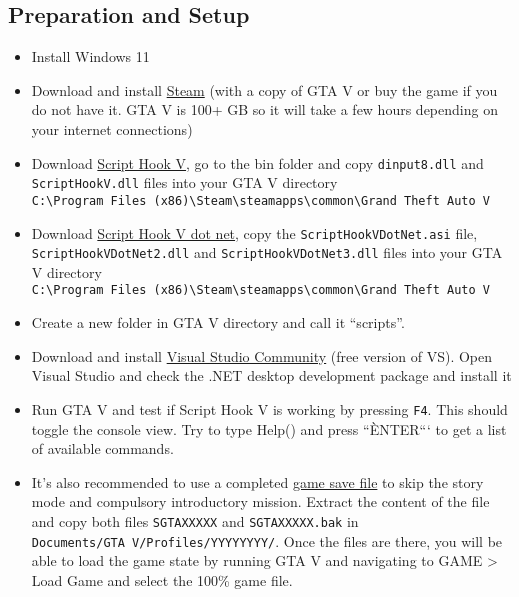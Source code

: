 \documentclass[
  openany]{book}
\begin{document}
\hypertarget{preparation-and-setup}{%
\subsection*{Preparation and Setup}\label{preparation-and-setup}}

\begin{itemize}
\item
  Install Windows 11
\item
  Download and install \href{https://store.steampowered.com/about/}{Steam} (with a copy of GTA V or buy the game if you do not have it. GTA V is 100+ GB so it will take a few hours depending on your internet connections)
\item
  Download \href{https://www.gta5-mods.com/tools/script-hook-v}{Script Hook V}, go to the bin folder and copy \texttt{dinput8.dll} and \texttt{ScriptHookV.dll} files into your GTA V directory \texttt{C:\textbackslash{}Program\ Files\ (x86)\textbackslash{}Steam\textbackslash{}steamapps\textbackslash{}common\textbackslash{}Grand\ Theft\ Auto\ V}
\item
  Download \href{https://github.com/crosire/scripthookvdotnet/releases}{Script Hook V dot net}, copy the \texttt{ScriptHookVDotNet.asi} file, \texttt{ScriptHookVDotNet2.dll} and \texttt{ScriptHookVDotNet3.dll} files into your GTA V directory \texttt{C:\textbackslash{}Program\ Files\ (x86)\textbackslash{}Steam\textbackslash{}steamapps\textbackslash{}common\textbackslash{}Grand\ Theft\ Auto\ V}
\item
  Create a new folder in GTA V directory and call it ``scripts''.
\item
  Download and install \href{https://visualstudio.microsoft.com/vs/community/}{Visual Studio Community} (free version of VS). Open Visual Studio and check the .NET desktop development package and install it
\item
  Run GTA V and test if Script Hook V is working by pressing \texttt{F4}. This should toggle the console view. Try to type Help() and press ``ÈNTER``` to get a list of available commands.
\item
  It's also recommended to use a completed \href{https://www.gta5-mods.com/misc/100-save-game}{game save file} to skip the story mode and compulsory introductory mission. Extract the content of the file and copy both files \texttt{SGTAXXXXX} and \texttt{SGTAXXXXX.bak} in \texttt{Documents/GTA\ V/Profiles/YYYYYYYY/}. Once the files are there, you will be able to load the game state by running GTA V and navigating to GAME \textgreater{} Load Game and select the 100\% game file.
\end{itemize}
\end{document}
